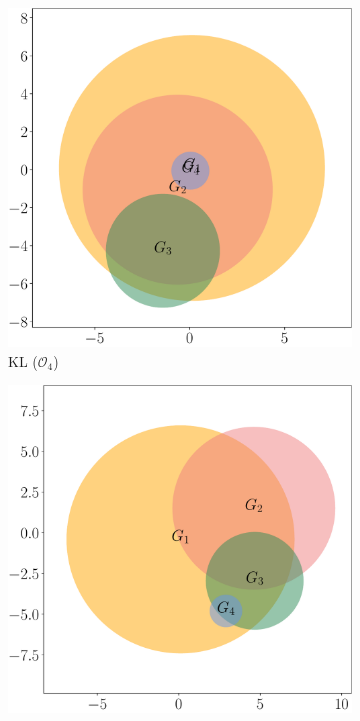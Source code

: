 \documentclass{article}
\begin{document}
\renewcommand{\thefigure}{\arabic{figure} (Cont.)}
\addtocounter{figure}{-1}
\begin{figure}[t]
\centering
\begin{subfigure}[b]{.48\textwidth}
\addtocounter{subfigure}{6}
\includegraphics[width=\textwidth]{kl4}
\caption{KL ($\mathcal{O}_4$)}
\end{subfigure}
\begin{subfigure}[b]{.48\textwidth}
\includegraphics[width=\textwidth]{js4}

\end{subfigure}
\end{figure}
\end{document}
